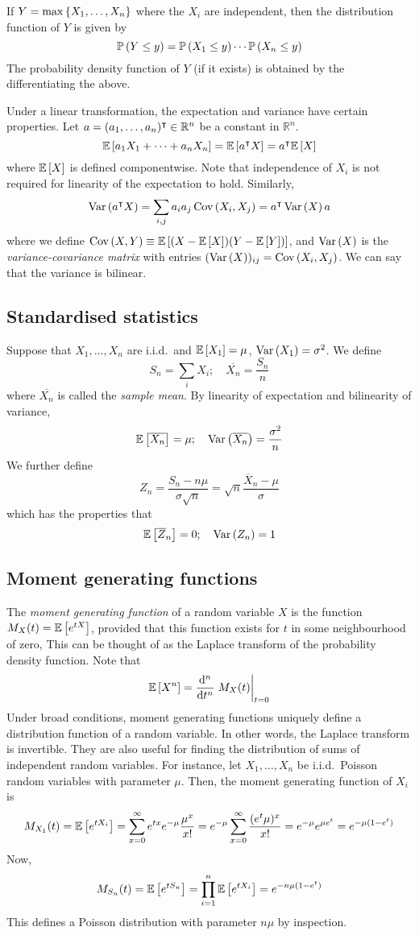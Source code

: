 If \( Y = \max\qty{X_1, \dots, X_n} \) where the \( X_i \) are independent, then the distribution function of \( Y \) is given by
\[ \mathbb{P}\left({Y \leq y}\right) = \mathbb{P}\left({X_1 \leq y}\right) \cdots \mathbb{P}\left({X_n \leq y}\right) \]
The probability density function of \( Y \) (if it exists) is obtained by the differentiating the above.

Under a linear transformation, the expectation and variance have certain properties.
Let \( a = (a_1, \dots, a_n)^\intercal \in \mathbb R^n \) be a constant in \( \mathbb R^n \).
\[ \mathbb{E}\left[{a_1 X_1 + \dots + a_n X_n}\right] = \mathbb{E}\left[{a^\intercal X}\right] = a^\intercal \mathbb{E}\left[{X}\right] \]
where \( \mathbb{E}\left[{X}\right] \) is defined componentwise.
Note that independence of \( X_i \) is not required for linearity of the expectation to hold.
Similarly,
\[ \operatorname{Var}\left({a^\intercal X}\right) = \sum_{i,j} a_i a_j \operatorname{Cov}\left({X_i, X_j}\right) = a^\intercal \operatorname{Var}\left({X}\right) a \]
where we define \( \operatorname{Cov}\left({X, Y}\right) \equiv \mathbb{E}\left[{(X - \mathbb{E}\left[{X}\right])(Y - \mathbb{E}\left[{Y}\right])}\right] \), and \( \operatorname{Var}\left({X}\right) \) is the \textit{variance-covariance matrix} with entries \( (\operatorname{Var}\left({X}\right))_{ij} = \operatorname{Cov}\left({X_i, X_j}\right) \).
We can say that the variance is bilinear.

\subsection{Standardised statistics}
Suppose that \( X_1, \dots, X_n \) are i.i.d.\ and \( \mathbb{E}\left[{X_1}\right] = \mu \), \( \operatorname{Var}\left({X_1}\right) = \sigma^2 \).
We define
\[ S_n = \sum_i X_i;\quad \overline{X_n} = \frac{S_n}{n} \]
where \( \overline{X_n} \) is called the \textit{sample mean}.
By linearity of expectation and bilinearity of variance,
\[ \mathbb{E}\left[{\overline{X_n}}\right] = \mu;\quad \operatorname{Var}\left({\overline {X_n}}\right) = \frac{\sigma^2}{n} \]
We further define
\[ Z_n = \frac{S_n - n\mu}{\sigma\sqrt{n}} = \sqrt{n} \frac{\overline X_n - \mu}{\sigma} \]
which has the properties that
\[ \mathbb{E}\left[{\overline Z_n}\right] = 0;\quad \operatorname{Var}\left({Z_n}\right) = 1 \]

\subsection{Moment generating functions}
The \textit{moment generating function} of a random variable \( X \) is the function \( M_X(t) = \mathbb{E}\left[{e^{tX}}\right] \), provided that this function exists for \( t \) in some neighbourhood of zero,
This can be thought of as the Laplace transform of the probability density function.
Note that
\[ \expect{X^n} = \dv[n]{t} \eval{M_X(t)}_{t = 0} \]
Under broad conditions, moment generating functions uniquely define a distribution function of a random variable.
In other words, the Laplace transform is invertible.
They are also useful for finding the distribution of sums of independent random variables.
For instance, let \( X_1, \dots, X_n \) be i.i.d.\ Poisson random variables with parameter \( \mu \).
Then, the moment generating function of \( X_i \) is
\[ M_{X_1}(t) = \mathbb{E}\left[{e^{tX_i}}\right] = \sum_{x = 0}^\infty e^{tx} e^{-\mu} \frac{\mu^x}{x!} = e^{-\mu} \sum_{x=0}^\infty \frac{(e^t \mu)^x}{x!} = e^{-\mu} e^{\mu e^t} = e^{-\mu(1-e^t)} \]
Now,
\[ M_{S_n}(t) = \mathbb{E}\left[{e^{tS_n}}\right] = \prod_{i=1}^n \mathbb{E}\left[{e^{tX_i}}\right] = e^{-n\mu(1-e^t)} \]
This defines a Poisson distribution with parameter \( n \mu \) by inspection.

